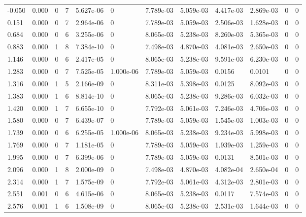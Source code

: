 \documentclass[preview]{standalone}
\begin{document}
{{\begin{tabular}{L{1.2cm}C{1.2cm} C{0.3cm}C{0.5cm} C{1.4cm}C{1.4cm} C{1.4cm}C{1.4cm} C{1.6cm}C{1.6cm} C{1.6cm}C{1.6cm}}
  -0.050  &  0.000  & 0     &  7 &  5.627e-06  & 0  &  7.789e-03&   5.059e-03& 4.417e-03 & 2.869e-03   &  0 & 0  \\ 
  0.151  &  0.000  & 0     &  7 &  2.964e-06  & 0  &  7.789e-03&   5.059e-03& 2.506e-03 & 1.628e-03   &  0 & 0  \\ 
  0.684  &  0.000  & 0     &  6 &  3.255e-06  & 0  &  8.065e-03&   5.238e-03& 8.260e-03 & 5.365e-03   &  0 & 0  \\ 
  0.883  &  0.000  & 1     &  8 &  7.384e-10  & 0  &  7.498e-03&   4.870e-03& 4.081e-03 & 2.650e-03   &  0 & 0  \\ 
  1.146  &  0.000  & 0     &  6 &  2.417e-05  & 0  &  8.065e-03&   5.238e-03& 9.591e-03 & 6.230e-03   &  0 & 0  \\ 
  1.283  &  0.000  & 0     &  7 &  7.525e-05  & 1.000e-06  &  7.789e-03&   5.059e-03& 0.0156 & 0.0101   &  0 & 0  \\ 
  1.316  &  0.000  & 1     &  5 &  2.166e-09  & 0  &  8.311e-03&   5.398e-03& 0.0125 & 8.092e-03   &  0 & 0  \\ 
  1.383  &  0.000  & 1     &  6 &  8.814e-10  & 0  &  8.065e-03&   5.238e-03& 9.286e-03 & 6.032e-03   &  0 & 0  \\ 
  1.420  &  0.000  & 1     &  7 &  6.655e-10  & 0  &  7.792e-03&   5.061e-03& 7.246e-03 & 4.706e-03   &  0 & 0  \\ 
  1.580  &  0.000  & 0     &  7 &  6.439e-07  & 0  &  7.789e-03&   5.059e-03& 1.545e-03 & 1.003e-03   &  0 & 0  \\ 
  1.739  &  0.000  & 0     &  6 &  6.255e-05  & 1.000e-06  &  8.065e-03&   5.238e-03& 9.234e-03 & 5.998e-03   &  0 & 0  \\ 
  1.769  &  0.000  & 0     &  7 &  1.181e-05  & 0  &  7.789e-03&   5.059e-03& 1.939e-03 & 1.259e-03   &  0 & 0  \\ 
  1.995  &  0.000  & 0     &  7 &  6.399e-06  & 0  &  7.789e-03&   5.059e-03& 0.0131 & 8.501e-03   &  0 & 0  \\ 
  2.096  &  0.000  & 1     &  8 &  2.000e-09  & 0  &  7.498e-03&   4.870e-03& 4.082e-04 & 2.650e-04   &  0 & 0  \\ 
  2.314  &  0.000  & 1     &  7 &  1.575e-09  & 0  &  7.792e-03&   5.061e-03& 4.312e-03 & 2.801e-03   &  0 & 0  \\ 
  2.551  &  0.001  & 0     &  6 &  4.615e-06  & 0  &  8.065e-03&   5.238e-03& 0.0117 & 7.574e-03   &  0 & 0  \\ 
  2.576  &  0.001  & 1     &  6 &  1.508e-09  & 0  &  8.065e-03&   5.238e-03& 2.531e-03 & 1.644e-03   &  0 & 0  \\ 

\end{tabular}}}
\end{document}
